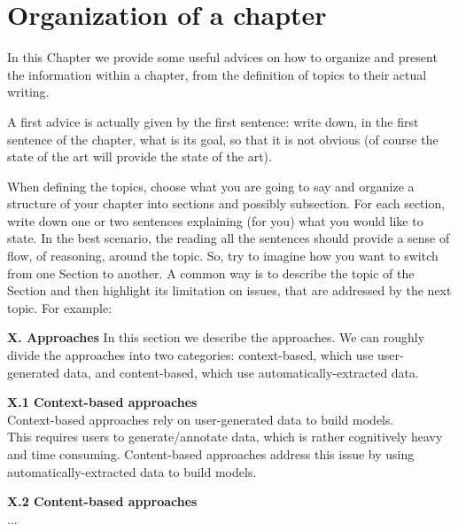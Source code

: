 \chapter{Organization of a chapter}

In this Chapter we provide some useful advices on how to organize and present the information within a chapter, from the definition of topics to their actual writing. 

A first advice is actually given by the first sentence: write down, in the first sentence of the chapter, what is its goal, so that it is not obvious (of course the state of the art will provide the state of the art). 

When defining the topics, choose what you are going to say and organize a structure of your chapter into sections and possibly subsection. For each section, write down one or two sentences explaining (for you) what you would like to state. In the best scenario, the reading all the sentences should provide a sense of flow, of reasoning, around the topic. So, try to imagine how you want to switch from one Section to another. A common way is to describe the topic of the Section and then highlight its limitation on issues, that are addressed by the next topic. For example:

\textbf{X. Approaches}
In this section we describe the approaches. We can roughly divide the approaches into two categories: context-based, which use user-generated data, and content-based, which use automatically-extracted data.

\textbf{X.1 Context-based approaches}\\
Context-based approaches rely on user-generated data to build models. \\
This requires users to generate/annotate data, which is rather cognitively heavy and time consuming. Content-based approaches address this issue by using automatically-extracted data to build models.

\textbf{X.2 Content-based approaches}\\
...

